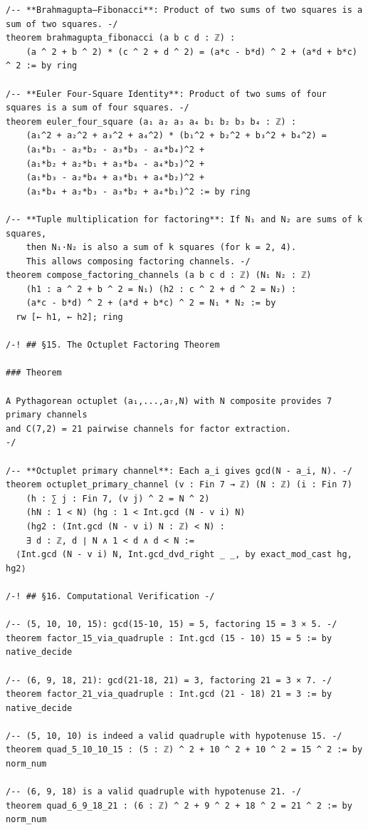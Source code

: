 \documentclass[11pt,openany]{book}
\theoremstyle{definition}
\theoremstyle{plain}
\theoremstyle{remark}
\begin{document}
\begin{lstlisting}[style=lean]
/-- **Brahmagupta–Fibonacci**: Product of two sums of two squares is a sum of two squares. -/
theorem brahmagupta_fibonacci (a b c d : ℤ) :
    (a ^ 2 + b ^ 2) * (c ^ 2 + d ^ 2) = (a*c - b*d) ^ 2 + (a*d + b*c) ^ 2 := by ring

/-- **Euler Four-Square Identity**: Product of two sums of four squares is a sum of four squares. -/
theorem euler_four_square (a₁ a₂ a₃ a₄ b₁ b₂ b₃ b₄ : ℤ) :
    (a₁^2 + a₂^2 + a₃^2 + a₄^2) * (b₁^2 + b₂^2 + b₃^2 + b₄^2) =
    (a₁*b₁ - a₂*b₂ - a₃*b₃ - a₄*b₄)^2 +
    (a₁*b₂ + a₂*b₁ + a₃*b₄ - a₄*b₃)^2 +
    (a₁*b₃ - a₂*b₄ + a₃*b₁ + a₄*b₂)^2 +
    (a₁*b₄ + a₂*b₃ - a₃*b₂ + a₄*b₁)^2 := by ring

/-- **Tuple multiplication for factoring**: If N₁ and N₂ are sums of k squares,
    then N₁·N₂ is also a sum of k squares (for k = 2, 4).
    This allows composing factoring channels. -/
theorem compose_factoring_channels (a b c d : ℤ) (N₁ N₂ : ℤ)
    (h1 : a ^ 2 + b ^ 2 = N₁) (h2 : c ^ 2 + d ^ 2 = N₂) :
    (a*c - b*d) ^ 2 + (a*d + b*c) ^ 2 = N₁ * N₂ := by
  rw [← h1, ← h2]; ring

/-! ## §15. The Octuplet Factoring Theorem

### Theorem

A Pythagorean octuplet (a₁,...,a₇,N) with N composite provides 7 primary channels
and C(7,2) = 21 pairwise channels for factor extraction.
-/

/-- **Octuplet primary channel**: Each a_i gives gcd(N - a_i, N). -/
theorem octuplet_primary_channel (v : Fin 7 → ℤ) (N : ℤ) (i : Fin 7)
    (h : ∑ j : Fin 7, (v j) ^ 2 = N ^ 2)
    (hN : 1 < N) (hg : 1 < Int.gcd (N - v i) N)
    (hg2 : (Int.gcd (N - v i) N : ℤ) < N) :
    ∃ d : ℤ, d ∣ N ∧ 1 < d ∧ d < N :=
  ⟨Int.gcd (N - v i) N, Int.gcd_dvd_right _ _, by exact_mod_cast hg, hg2⟩

/-! ## §16. Computational Verification -/

/-- (5, 10, 10, 15): gcd(15-10, 15) = 5, factoring 15 = 3 × 5. -/
theorem factor_15_via_quadruple : Int.gcd (15 - 10) 15 = 5 := by native_decide

/-- (6, 9, 18, 21): gcd(21-18, 21) = 3, factoring 21 = 3 × 7. -/
theorem factor_21_via_quadruple : Int.gcd (21 - 18) 21 = 3 := by native_decide

/-- (5, 10, 10) is indeed a valid quadruple with hypotenuse 15. -/
theorem quad_5_10_10_15 : (5 : ℤ) ^ 2 + 10 ^ 2 + 10 ^ 2 = 15 ^ 2 := by norm_num

/-- (6, 9, 18) is a valid quadruple with hypotenuse 21. -/
theorem quad_6_9_18_21 : (6 : ℤ) ^ 2 + 9 ^ 2 + 18 ^ 2 = 21 ^ 2 := by norm_num


\end{lstlisting}
\end{document}

